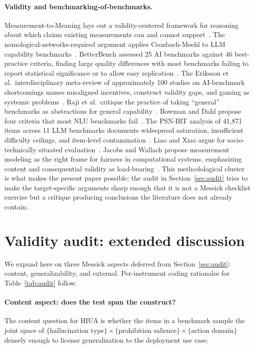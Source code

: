 \documentclass{article}
\begin{document}
\paragraph{Validity and benchmarking-of-benchmarks.}
Measurement-to-Meaning lays out a validity-centered framework for reasoning about which claims existing measurements can and cannot support~\cite{m2m2025}. The nomological-networks-required argument applies Cronbach-Meehl to LLM capability benchmarks~\cite{nomologicalnetworks2026}. BetterBench assessed 25 AI benchmarks against 46 best-practice criteria, finding large quality differences with most benchmarks failing to report statistical significance or to allow easy replication~\cite{betterbench2024}. The Eriksson et al.\ interdisciplinary meta-review of approximately 100 studies on AI-benchmark shortcomings names misaligned incentives, construct validity gaps, and gaming as systemic problems~\cite{canwetrust2025}. Raji et al.\ critique the practice of taking ``general'' benchmarks as abstractions for general capability~\cite{raji2021}. Bowman and Dahl propose four criteria that most NLU benchmarks fail~\cite{bowmandahl2021}. The PSN-IRT analysis of 41{,}871 items across 11 LLM benchmarks documents widespread saturation, insufficient difficulty ceilings, and item-level contamination~\cite{lostinbench2025}. Liao and Xiao argue for socio-technically situated evaluation~\cite{liaoxiao2023}. Jacobs and Wallach propose measurement modeling as the right frame for fairness in computational systems, emphasizing content and consequential validity as load-bearing~\cite{jacobswallach2021}. This methodological cluster is what makes the present paper possible; the audit in Section~\ref{sec:audit} tries to make the target-specific arguments sharp enough that it is not a Messick checklist exercise but a critique producing conclusions the literature does not already contain.

\section{Validity audit: extended discussion}
\label{app:audit}

We expand here on three Messick aspects deferred from Section~\ref{sec:audit}: content, generalizability, and external. Per-instrument coding rationales for Table~\ref{tab:audit} follow.

\paragraph{Content aspect: does the test span the construct?}
The content question for HIUA is whether the items in a benchmark sample the joint space of $\{\text{hallucination type}\} \times \{\text{prohibition salience}\} \times \{\text{action domain}\}$ densely enough to license generalization to the deployment use case.
\end{document}
